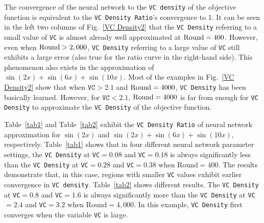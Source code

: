 \documentclass[final]{siamart220329}
\newtheorem{theoretical insights}{Theoretical insights}
\newtheorem{practical takeaway}{Practical takeaway}
\begin{document}
{{{The convergence of the neural network to the \texttt{VC density} of the objective function is equivalent to the \texttt{VC Density Ratio}'s convergence to 1. It can be seen in the left two columns of {\color{black}Fig.~\ref{VC Density2}} that the \texttt{VC Density} referring to a small value of \texttt{VC} is almost already well approximated at ${\rm Round}=400$. However, even when ${\rm Round} >2,000$, \texttt{VC Density} referring to a large value of \texttt{VC} still exhibits a large error (also true for the ratio curve in the right-hand side). This phenomenon also exists in the approximation of $\sin(2x)+\sin(6x)+\sin(10x)$. Most of the examples in Fig.~\ref{VC Density2} show that when $\texttt{VC}>2.1$ and ${\rm Round}=4000$, \texttt{VC Density} has been basically learned. However, for $\texttt{VC}<2.1$, ${\rm Round}=4000$ is far from enough for \texttt{VC Density} to approximate the \texttt{VC Density} of the objective function.



{\color{black}Table~\ref{tab1} and Table~\ref{tab2}} exhibit the \texttt{VC Density Ratio} of neural network approximation for $\sin(2x)$ and $\sin(2x)+\sin(6x)+\sin(10x)$, respectively. Table~\ref{tab1} shows that in four different neural network parameter settings, the \texttt{VC Density} at \texttt{VC}$=0.08$ and \texttt{VC}$=0.18$ is always significantly less than the \texttt{VC Density} at \texttt{VC}$=0.28$ and \texttt{VC}$=0.38$ when Round$=400$.  
The results demonstrate that, in this case, regions with smaller \texttt{VC} values exhibit earlier convergence in \texttt{VC density}. 
Table~\ref{tab2} shows different results. {The} \texttt{VC Density} at \texttt{VC}$=0.8$ and \texttt{VC}$=1.6$ is always significantly more than the \texttt{VC Density} at \texttt{VC}$=2.4$ and \texttt{VC}$=3.2$ when Round$=4,000$. In this example, \texttt{VC Density} first converges when the variable \texttt{VC} is large.  


}}}
\end{document}
